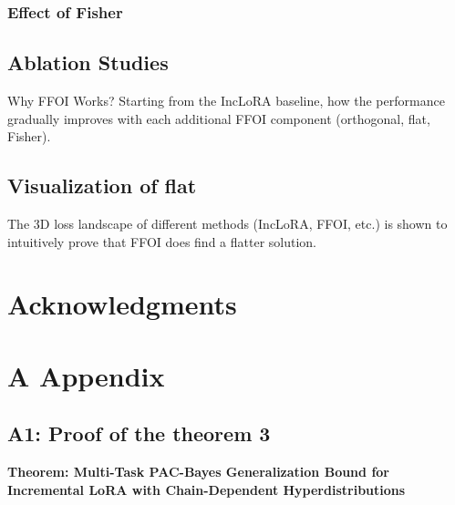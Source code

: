 \documentclass[letterpaper]{article} %
\newcommand{\LYY}[1]{{\color{magenta}{\bf LYY:} #1}}
\begin{document}

\subsubsection{Effect of Fisher}




\subsection{Ablation Studies}
\LYY{Why FFOI Works? Starting from the IncLoRA baseline, how the performance gradually improves with each additional FFOI component (orthogonal, flat, Fisher).}

\subsection{Visualization of flat}
\LYY{The 3D loss landscape of different methods (IncLoRA, FFOI, etc.) is shown to intuitively prove that FFOI does find a flatter solution.}





\section{Acknowledgments}







\appendix

\section{A Appendix}

\subsection{A1: Proof of the theorem 3}
\textbf{Theorem: Multi-Task PAC-Bayes Generalization Bound for Incremental LoRA with Chain-Dependent Hyperdistributions}
\end{document}
